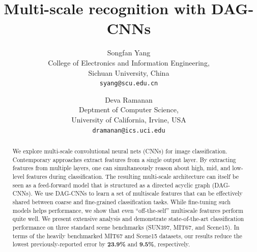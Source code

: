 \documentclass[10pt,twocolumn,letterpaper]{article}
\begin{document}
\title{Multi-scale recognition with DAG-CNNs}

\author{Songfan Yang\\
College of Electronics and Information Engineering,\\
Sichuan University, China\\
{\tt\small syang@scu.edu.cn}
\and
Deva Ramanan\\
Deptment of Computer Science,\\
University of California, Irvine, USA\\
{\tt\small dramanan@ics.uci.edu}
}

\maketitle

\begin{abstract}
We explore multi-scale convolutional neural nets (CNNs) for image classification. Contemporary approaches extract features from a single output layer. By extracting features from multiple layers, one can simultaneously reason about high, mid, and low-level features during classification. The resulting multi-scale architecture can itself be seen as a feed-forward model that is structured as a directed acyclic graph (DAG-CNNs). %
We use DAG-CNNs to learn a set of multiscale features that can be effectively shared between coarse and fine-grained classification tasks. While fine-tuning such models helps performance, we show that even ``off-the-self'' multiscale features perform quite well. We present extensive analysis and demonstrate state-of-the-art classification performance on three standard scene benchmarks (SUN397, MIT67, and Scene15). %
In terms of the heavily benchmarked MIT67 and Scene15 datasets, our results reduce the lowest previously-reported error by {\bf 23.9\%} and {\bf 9.5\%}, respectively.
\end{abstract}
\end{document}
